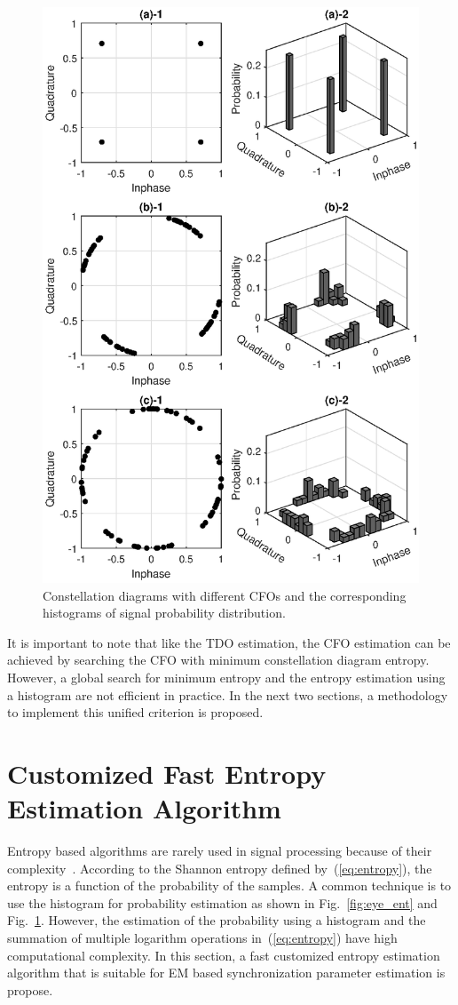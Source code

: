 \documentclass[12pt, draftclsnofoot, onecolumn]{IEEEtran}
\begin{document}
\begin{figure}[ht]
\centering
\includegraphics[width=3.5 in]{pic/const_hst-k.eps}
\caption{Constellation diagrams with different CFOs and the corresponding histograms of signal probability distribution.}
\label{fig:const_hst} 
\end{figure}

It is important to note that like the TDO estimation, the CFO estimation can be achieved by searching the CFO with minimum constellation diagram entropy.
However, a global search for minimum entropy and the entropy estimation using a histogram are not efficient in practice.
In the next two sections, a methodology to implement this unified criterion is proposed.

\section{Customized Fast Entropy Estimation Algorithm}
\label{sec:cust_entp}
Entropy based algorithms are rarely used in signal processing because of their complexity~\cite{Bercher2000}.
According to the Shannon entropy defined by~(\ref{eq:entropy}), the entropy is a function of the probability of the samples.
A common technique is to use the histogram for probability estimation as shown in Fig.~\ref{fig:eye_ent} and Fig.~\ref{fig:const_hst}.
However, the estimation of the probability using a histogram and the summation of multiple logarithm operations  in~(\ref{eq:entropy}) have high computational complexity.
In this section, a fast customized entropy estimation algorithm that is suitable for EM based synchronization parameter estimation is propose. 
\end{document}
